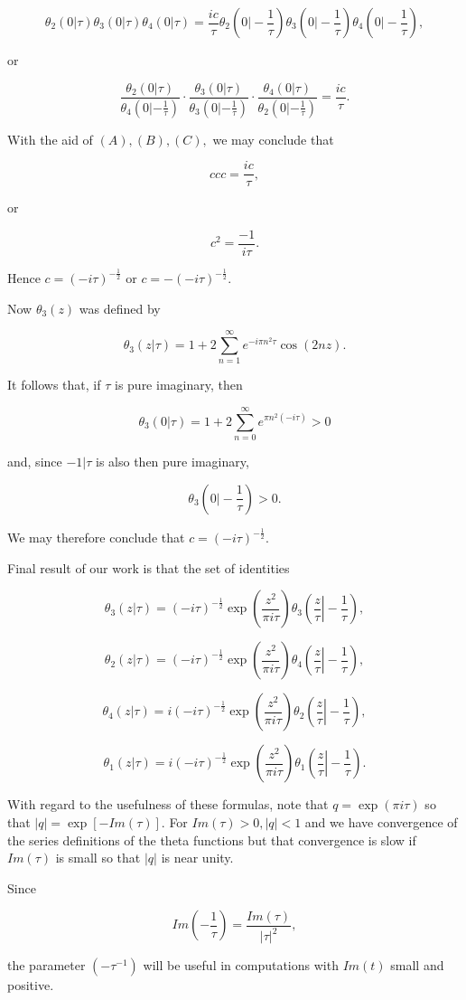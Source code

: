 \begin{solution}
$$\theta_2(0|\tau) \theta_3(0|\tau) \theta_4(0|\tau) = \dfrac{ic}{\tau} \theta_2 \left( \left. 0 \right| -\dfrac{1}{\tau} \right) \theta_3 \left( \left. 0 \right| -\dfrac{1}{\tau} \right) \theta_4 \left( \left. 0 \right| - \dfrac{1}{\tau} \right),$$

or

$$\dfrac{\theta_2(0|\tau)}{\theta_4(0|-\frac{1}{\tau})} \cdot \dfrac{\theta_3(0|\tau)}{\theta_3(0|-\frac{1}{\tau})} \cdot \dfrac{\theta_4(0|\tau)}{\theta_2(0|-\frac{1}{\tau})} = \dfrac{ic}{\tau}.$$

With the aid of $(A), (B), (C),$ we may conclude that

$$ccc = \dfrac{ic}{\tau},$$

or

$$c^2 = \dfrac{-1}{i \tau}.$$

Hence $c = (-i \tau)^{-\frac{1}{2}}$ or $c = -(-i \tau)^{-\frac{1}{2}}$. 

Now $\theta_3(z)$ was defined by 

$$\theta_3(z | \tau) = 1 + 2 \displaystyle\sum_{n=1}^{\infty} e^{-i \pi n^2 \tau} \cos(2nz).$$

It follows that, if $\tau$ is pure imaginary, then

$$\theta_3(0|\tau) = 1+ 2 \displaystyle\sum_{n=0}^{\infty} e^{\pi n^2(-i \tau)} > 0$$

and, since $-1 | \tau$ is also then pure imaginary,

$$\theta_3 \left( \left. 0 \right| -\dfrac{1}{\tau} \right) > 0.$$

We may therefore conclude that $c = (-i \tau)^{-\frac{1}{2}}$. 

Final result of our work is that the set of identities

$$\theta_3(z| \tau) = (-i \tau)^{-\frac{1}{2}} \exp \left( \dfrac{z^2}{\pi i \tau} \right) \theta_3 \left( \left. \dfrac{z}{\tau} \right| -\dfrac{1}{\tau} \right),$$

$$\theta_2(z | \tau) = (-i \tau)^{-\frac{1}{2}} \exp \left( \dfrac{z^2}{\pi i \tau} \right) \theta_4 \left( \left. \dfrac{z}{\tau} \right| -\dfrac{1}{\tau} \right),$$

$$\theta_4(z | \tau) = i(-i \tau)^{-\frac{1}{2}} \exp \left( \dfrac{z^2}{\pi i \tau} \right) \theta_2 \left( \left. \dfrac{z}{\tau} \right| -\dfrac{1}{\tau} \right),$$

$$\theta_1(z|\tau) = i(-i\tau)^{-\frac{1}{2}} \exp \left( \dfrac{z^2}{\pi i \tau} \right) \theta_1 \left( \left. \dfrac{z}{\tau} \right| -\dfrac{1}{\tau} \right).$$

With regard to the usefulness of these formulas, note that $q = \exp(\pi i \tau)$ so that $|q| = \exp[-Im(\tau)].$ For $Im(\tau)>0, |q|<1$ and we have convergence of the series definitions of the theta functions but that convergence is slow if $Im(\tau)$ is small so that $|q|$ is near unity.

Since

$$Im \left( - \dfrac{1}{\tau} \right) = \dfrac{Im(\tau)}{|\tau|^2},$$

the parameter $(-\tau^{-1})$ will be useful in computations with $Im(t)$ small and positive.
\end{solution}